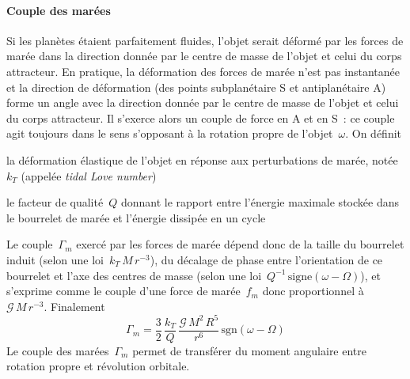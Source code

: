 
\sk
\paragraph{Couple des marées} Si les planètes étaient parfaitement fluides, l'objet serait déformé par les forces de marée dans la direction donnée par le centre de masse de l'objet et celui du corps attracteur. En pratique, la déformation des forces de marée n'est pas instantanée et la direction de déformation (des points subplanétaire S et antiplanétaire A) forme un angle avec la direction donnée par le centre de masse de l'objet et celui du corps attracteur. Il s'exerce alors un couple de force en A et en S~: ce couple agit toujours dans le sens s'opposant à la rotation propre de l'objet~$\omega$. On définit 
\begin{citemize}
\item la déformation élastique de l'objet en réponse aux perturbations de marée, notée $k_T$ (appelée \emph{tidal Love number})
\item le facteur de qualité~$Q$ donnant le rapport entre l'énergie maximale stockée dans le bourrelet de marée et l'énergie dissipée en un cycle 
\end{citemize}
\noindent Le couple~$\Gamma_m$ exercé par les forces de marée dépend donc de la taille du bourrelet induit (selon une loi~$k_T \, M \, r^{-3}$), du décalage de phase entre l'orientation de ce bourrelet et l'axe des centres de masse (selon une loi~$Q^{-1}\,\textrm{signe}(\omega-\Omega)$), et s'exprime comme le couple d'une force de marée~$f_m$ donc proportionnel à~$\mathcal{G}\,M\,r^{-3}$. Finalement
\[ \Gamma_m = \frac{3}{2} \, \frac{k_T}{Q} \, \frac{\mathcal{G}\,M^2\,R^5}{r^6} \, \textrm{sgn}(\omega-\Omega) \]
\noindent Le couple des marées~$\Gamma_m$ permet de transférer du moment angulaire entre rotation propre et révolution orbitale.

\sk
